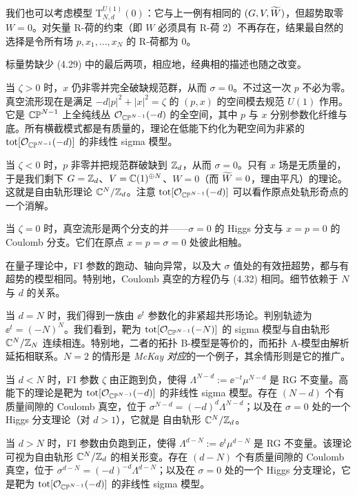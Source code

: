 

我们也可以考虑模型 $\mathrm{T}^{U(1)}_{N,d}(0)$：它与上一例有相同的 $(G,V,\widetilde{W})$，但超势取零 $W=0$。对矢量 R-荷的约束（即 $W$ 必须具有 R-荷 2）不再存在，结果最自然的选择是令所有场 $p,x_1,\ldots,x_N$ 的 R-荷都为 $0$。

标量势缺少 (4.29) 中的最后两项，相应地，经典相的描述也随之改变。

当 $\zeta>0$ 时，$x$ 仍非零并完全破缺规范群，从而 $\sigma=0$。不过这一次 $p$ 不必为零。真空流形现在是满足 $-d|p|^2+|x|^2=\zeta$ 的 $(p,x)$ 的空间模去规范 $U(1)$ 作用。它是 $\mathbb{CP}^{N-1}$ 上全纯线丛 $\mathcal{O}_{\mathbb{CP}^{N-1}}(-d)$ 的全空间，其中 $p$ 与 $x$ 分别参数化纤维与底。所有横截模式都是有质量的，理论在低能下约化为靶空间为非紧的 $\mathrm{tot}[\mathcal{O}_{\mathbb{CP}^{N-1}}(-d)]$ 的非线性 sigma 模型。

当 $\zeta<0$ 时，$p$ 非零并把规范群破缺到 $\mathbb{Z}_d$，从而 $\sigma=0$。只有 $x$ 场是无质量的，于是我们剩下 $G=\mathbb{Z}_d$、$V=\mathbb{C}(1)^{\oplus N}$、$W=0$（而 $\widetilde{W}=0$，理由平凡）的理论。这就是自由轨形理论 $\mathbb{C}^N/\mathbb{Z}_d$。注意 $\mathrm{tot}[\mathcal{O}_{\mathbb{CP}^{N-1}}(-d)]$ 可以看作原点处轨形奇点的一个消解。

当 $\zeta=0$ 时，真空流形是两个分支的并——$\sigma=0$ 的 Higgs 分支与 $x=p=0$ 的 Coulomb 分支。它们在原点 $x=p=\sigma=0$ 处彼此相触。

在量子理论中，FI 参数的跑动、轴向异常，以及大 $\sigma$ 值处的有效扭超势，都与有超势的模型相同。特别地，Coulomb 真空的方程仍与 (4.32) 相同。细节依赖于 $N$ 与 $d$ 的关系。

当 $d=N$ 时，我们得到一族由 $\ee^t$ 参数化的非紧超共形场论。判别轨迹为 $\ee^t=(-N)^N$。我们看到，靶为 $\mathrm{tot}[\mathcal{O}_{\mathbb{CP}^{N-1}}(-N)]$ 的 sigma 模型与自由轨形 $\mathbb{C}^N/\mathbb{Z}_N$ 连续相连。特别地，二者的拓扑 B-模型是等价的，而拓扑 A-模型由解析延拓相联系。$N=2$ 的情形是 \emph{McKay 对应}的一个例子，其余情形则是它的推广。

当 $d<N$ 时，FI 参数 $\zeta$ 由正跑到负，使得 $\Lambda^{N-d}:=\ee^{-t}\mu^{N-d}$ 是 RG 不变量。高能下的理论是靶为 $\mathrm{tot}[\mathcal{O}_{\mathbb{CP}^{N-1}}(-d)]$ 的非线性 sigma 模型。存在 $(N-d)$ 个有质量间隙的 Coulomb 真空，位于 $\sigma^{N-d}=(-d)^d\Lambda^{N-d}$；以及在 $\sigma=0$ 处的一个 Higgs 分支理论（对 $d>1$），它就是
自由轨形 $\mathbb{C}^N/\mathbb{Z}_d$。

当 $d>N$ 时，FI 参数由负跑到正，使得 $\Lambda^{d-N}:=\ee^{t}\mu^{d-N}$ 是 RG 不变量。该理论可视为自由轨形 $\mathbb{C}^N/\mathbb{Z}_d$ 的相关形变。存在 $(d-N)$ 个有质量间隙的 Coulomb 真空，位于 $\sigma^{d-N}=(-d)^{-d}\Lambda^{d-N}$；以及在 $\sigma=0$ 处的一个 Higgs 分支理论，它是靶为 $\mathrm{tot}[\mathcal{O}_{\mathbb{CP}^{N-1}}(-d)]$ 的非线性 sigma 模型。

